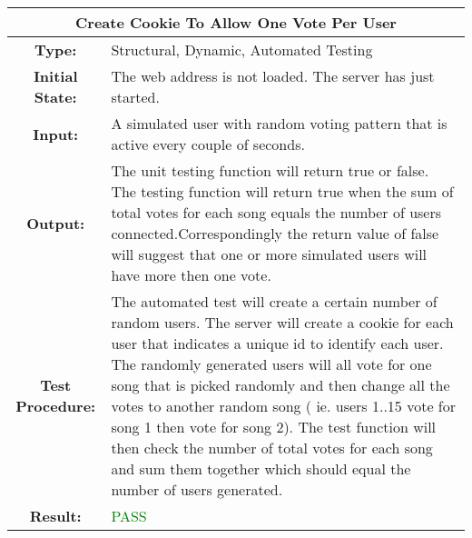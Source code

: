 \documentclass[12pt, titlepage]{article}
\begin{document}
\begin{center}
\begin{table}[H]
\begin{tabularx}{\textwidth}{| c X |}
\hline
\multicolumn{2}{|c|}{\textbf{Create Cookie To Allow One Vote Per User}}\\
\hline
\textbf{Type: } & Structural, Dynamic, Automated Testing\\


\textbf{Initial State: } & The web address is not loaded. The server has just started.\\


\textbf{Input: } & A simulated user with random voting pattern that is active every couple of seconds.\\


\textbf{Output: } & The unit testing function will return true or false. The testing function will return true when the sum of total votes for each song  equals the number of users connected.Correspondingly the return value of false will suggest that one or more simulated users will have more then one vote.\\


\textbf{Test Procedure:  } & The automated test will create a certain number of random users. The server will create a cookie for each user that indicates a unique id to identify each user. The randomly generated users will all vote for one song that is picked randomly and then change all the votes to another random song ( ie. users 1..15 vote for song 1 then vote for song 2). The test function will then check the number of total votes for each song and sum them together which should equal the number of users generated. \\


\textbf{Result: } & \textcolor{green}{PASS}\\
\hline
\end{tabularx}
\end{table}
\end{center}
\end{document}

